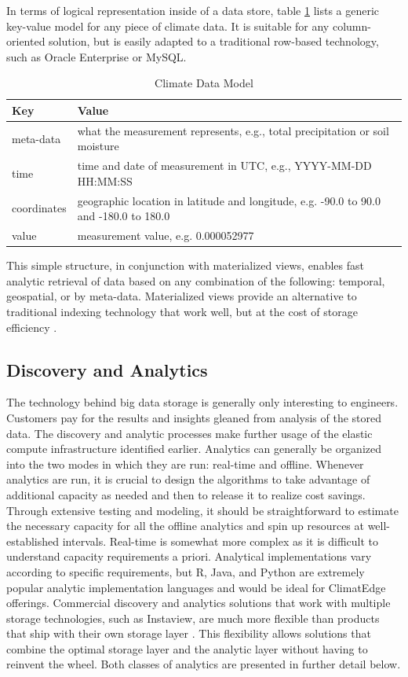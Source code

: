 In terms of logical representation inside of a data store, table \ref{model} lists a generic key-value model for any piece of climate data. It is suitable for any column-oriented solution, but is easily adapted to a traditional row-based technology, such as Oracle Enterprise or MySQL.
\begin{table}[htbp]
    \centering
    \begin{tabular}{l l}
        \hline
	Key & Value \\ [0.5ex]
	\hline
	meta-data & what the measurement represents, e.g., total precipitation or soil moisture\\
	time & time and date of measurement in UTC, e.g., YYYY-MM-DD HH:MM:SS\\
	coordinates & geographic location in latitude and longitude, e.g. -90.0 to 90.0 and -180.0 to 180.0\\
	value & measurement value, e.g. 0.000052977\\
	\hline
    \end{tabular}
    \caption{Climate Data Model}
    \label{model}
\end{table}
This simple structure, in conjunction with materialized views, enables fast analytic retrieval of data based on any combination of the following: temporal, geospatial, or by meta-data. Materialized views provide an alternative to traditional indexing technology that work well, but at the cost of storage efficiency \cite{materialized_views}. 
\subsection{Discovery and Analytics}
The technology behind big data storage is generally only interesting to engineers. Customers pay for the results and insights gleaned from analysis of the stored data. The discovery and analytic processes make further usage of the elastic compute infrastructure identified earlier. Analytics can generally be organized into the two modes in which they are run: real-time and offline. Whenever analytics are run, it is crucial to design the algorithms to take advantage of additional capacity as needed and then to release it to realize cost savings. Through extensive testing and modeling, it should be straightforward to estimate the necessary capacity for all the offline analytics and spin up resources at well-established intervals. Real-time is somewhat more complex as it is difficult to understand capacity requirements a priori. Analytical implementations vary according to specific requirements, but R, Java, and Python are extremely popular analytic implementation languages and would be ideal for ClimatEdge offerings. Commercial discovery and analytics solutions that work with multiple storage technologies, such as Instaview, are much more flexible than products that ship with their own storage layer \cite{pentaho}. This flexibility allows solutions that combine the optimal storage layer and the analytic layer without having to reinvent the wheel. Both classes of analytics are presented in further detail below.
